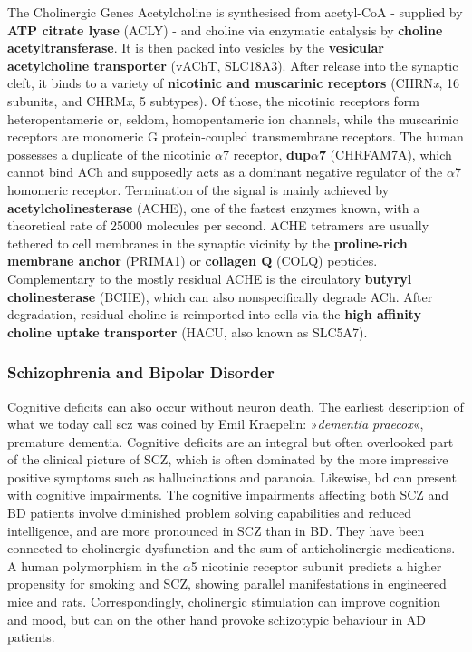 \begin{mybox}{The Cholinergic Genes}\label{box:chol-genes}
Acetylcholine is synthesised from acetyl-CoA - supplied by \textbf{ATP citrate lyase} (ACLY) - and choline via enzymatic catalysis by \textbf{choline acetyltransferase}. It is then packed into vesicles by the \textbf{vesicular acetylcholine transporter} (vAChT, SLC18A3). After release into the synaptic cleft, it binds to a variety of \textbf{nicotinic and muscarinic receptors} (CHRN\emph{x}, 16 subunits, and CHRM\emph{x}, 5 subtypes). Of those, the nicotinic receptors form heteropentameric or, seldom, homopentameric ion channels, while the muscarinic receptors are monomeric G protein-coupled transmembrane receptors. The human possesses a duplicate of the nicotinic $\alpha$7 receptor, \textbf{dup$\alpha$7} (CHRFAM7A), which cannot bind ACh and supposedly acts as a dominant negative regulator of the $\alpha$7 homomeric receptor. Termination of the signal is mainly achieved by \textbf{acetylcholinesterase} (ACHE), one of the fastest enzymes known, with a theoretical rate of \num{25000} molecules per second. ACHE tetramers are usually tethered to cell membranes in the synaptic vicinity by the \textbf{proline-rich membrane anchor} (PRIMA1) or \textbf{collagen Q} (COLQ) peptides. Complementary to the mostly residual ACHE is the circulatory \textbf{butyryl cholinesterase} (BCHE), which can also nonspecifically degrade ACh. After degradation, residual choline is reimported into cells via the \textbf{high affinity choline uptake transporter} (HACU, also known as SLC5A7).
\end{mybox}


\subsubsection{Schizophrenia and Bipolar Disorder} 
Cognitive deficits can also occur without neuron death. The earliest description of what we today call \ac{scz} was coined by Emil Kraepelin: »\emph{dementia praecox}«, premature dementia\cite{Kraepelin1913}. Cognitive deficits are an integral but often overlooked part of the clinical picture of SCZ, which is often dominated by the more impressive positive symptoms such as hallucinations and paranoia. Likewise, \ac{bd} can present with cognitive impairments. The cognitive impairments affecting both SCZ and BD patients involve diminished problem solving capabilities and reduced intelligence, and are more pronounced in SCZ than in BD\cite{Bortolato2015}. They have been connected to cholinergic dysfunction\cite{VanEnkhuizen2015, Smucny2017} and the sum of anticholinergic medications\cite{Gray2015, Eum2017}. A human polymorphism in the $\alpha$5 nicotinic receptor subunit predicts a higher propensity for smoking and SCZ, showing parallel manifestations in engineered mice\cite{Koukouli2017} and rats\cite{Forget2018}. Correspondingly, cholinergic stimulation can improve cognition\cite{Sacco2004, Rowe2015, Lewis2017} and mood\cite{Higley2014}, but can on the other hand provoke schizotypic behaviour in AD patients\cite{Degirmenci2016}.

